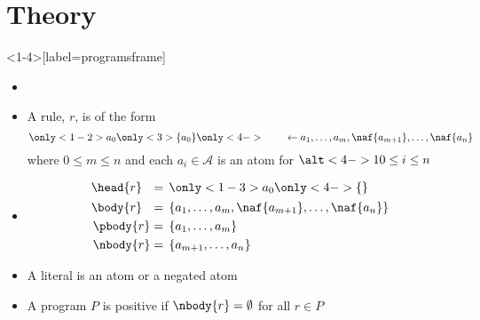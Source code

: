 \section{Theory}

\begin{frame}<1-4>[label=programsframe]{%
              }%
  \label{eqn:rule}
  \begin{itemize}
  \item %
  \item %
    A \alert<2-4>{} \alert<1-4>{rule}, $r$, is of the form
    \[
                  {\only<1-2>{a_0}\only<3>{\{a_0\}}\only<4->{\phantom{\{a_0\}}} \leftarrow   a_1,\dots,a_m,          \naf{a_{m+1}},\dots,          \naf{a_n}}
    \]
    where $0\leq m\leq n$ and each $a_i\in{\mathcal{A}}$ is an atom for $\alt<4->{1}{0}\leq i\leq n$
  \item %
    \begin{align*}
      \head{r}\phantom{^+}    &=\, \only<1-3>{a_0}\only<4->{{\{\}}}
      \\
      \body{r}\phantom{^+}    &=\, \{a_1,\dots,a_m,\naf{a_{m+1}},\dots,\naf{a_n}\}
      \\
      \pbody{r}               &=\, \{a_1,\dots,a_m\}
      \\
      \nbody{r}               &=\, \{a_{m+1},\dots,a_n\}
    \end{align*}%
  \item %
  A \alert<1>{literal} is an atom or a negated atom
  \item %
  A program $P$ is \alert<1>{positive} if $\nbody{r}=\emptyset$ for all $r\in P$
  \end{itemize}


\end{frame}
